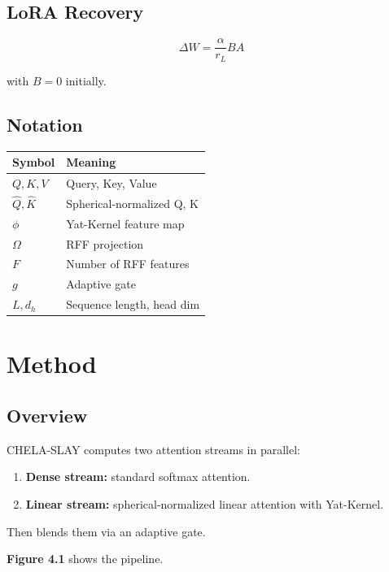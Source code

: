 \subsection{LoRA Recovery}

\[
\Delta W = \frac{\alpha}{r_L} B A
\]

with $B = 0$ initially.

\subsection{Notation}

\begin{table}[H]
\centering
\small
\begin{tabular}{ll}
\toprule
\textbf{Symbol} & \textbf{Meaning} \\
\midrule
$Q, K, V$ & Query, Key, Value \\
$\hat{Q}, \hat{K}$ & Spherical-normalized Q, K \\
$\phi$ & Yat-Kernel feature map \\
$\Omega$ & RFF projection \\
$F$ & Number of RFF features \\
$g$ & Adaptive gate \\
$L, d_h$ & Sequence length, head dim \\
\bottomrule
\end{tabular}
\end{table}



\section{Method}

\subsection{Overview}

CHELA-SLAY computes two attention streams in parallel:

\begin{enumerate}
\item \textbf{Dense stream:} standard softmax attention.
\item \textbf{Linear stream:} spherical-normalized linear attention with Yat-Kernel.

\end{enumerate}
Then blends them via an adaptive gate.

\textbf{Figure 4.1} shows the pipeline.


